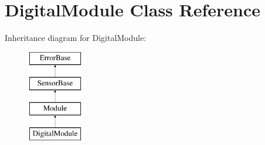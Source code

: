 \hypertarget{classDigitalModule}{
\section{DigitalModule Class Reference}
\label{classDigitalModule}
}
Inheritance diagram for DigitalModule:\begin{figure}[H]
\begin{center}
\leavevmode
\includegraphics[height=4.000000cm]{classDigitalModule}
\end{center}
\end{figure}
